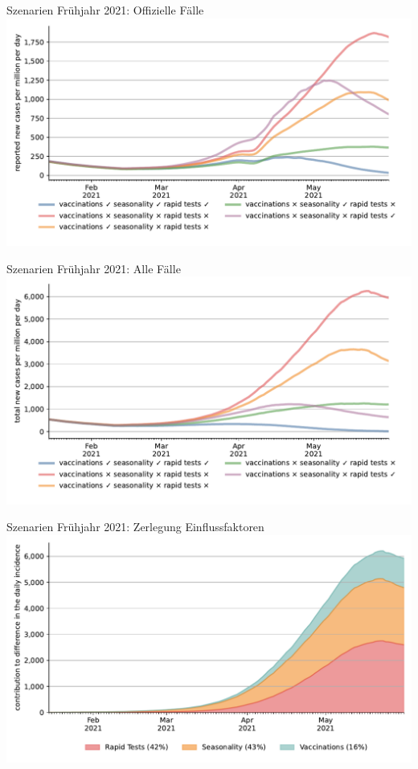 \documentclass[11pt]{beamer}
\begin{document}
\begin{frame}{Szenarien Frühjahr 2021: Offizielle Fälle}
    \centering
    \includegraphics[width=\textwidth]{figures/results/figures/scenario_comparisons/effect_of_channels_on_pessimistic_scenario/full_new_known_case}
\end{frame}


\begin{frame}{Szenarien Frühjahr 2021: Alle Fälle}
    \centering
    \includegraphics[width=\textwidth]{figures/results/figures/scenario_comparisons/effect_of_channels_on_pessimistic_scenario/full_newly_infected}
\end{frame}


\begin{frame}{Szenarien Frühjahr 2021: Zerlegung Einflussfaktoren}
    \centering
    \includegraphics[width=\textwidth]{figures/results/figures/full_decomposition_channels_area}
\end{frame}
\end{document}
